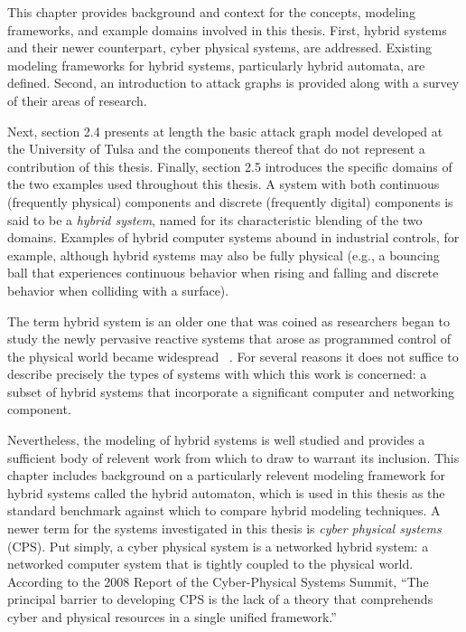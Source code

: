This chapter provides background and context for the concepts, modeling
frameworks, and example domains involved in this thesis. First, hybrid systems
and their newer counterpart, cyber physical systems, are addressed. Existing
modeling frameworks for hybrid systems, particularly hybrid automata, are
defined. Second, an introduction to attack graphs is provided along with a
survey of their areas of research.

Next, section 2.4 presents at length the basic attack graph model developed at the
University of Tulsa and the components thereof that do not represent a
contribution of this thesis. Finally, section 2.5 introduces the specific
domains of the two examples used throughout this thesis.
A system with both continuous (frequently physical) components and discrete (frequently digital)
components is said to be a \emph{hybrid system}, named for its characteristic blending of the
two domains. Examples of hybrid computer systems abound in industrial controls, for example,
although hybrid systems may also be fully physical (e.g., a bouncing ball that experiences continuous
behavior when rising and falling and discrete behavior when colliding with a surface).

The term hybrid system is an older one that was coined as researchers began to study the newly
pervasive reactive systems that arose as programmed control of the physical world became 
widespread ~\cite{alur1993hybrid}. For several reasons it does not suffice to describe precisely
the types of systems with which this work is concerned: a subset of hybrid
systems that incorporate a significant computer and networking component.

Nevertheless, the modeling of hybrid systems is well studied and provides a sufficient body
of relevent work from which to draw to warrant its inclusion. This chapter includes
background on a particularly relevent modeling framework for hybrid systems called the
hybrid automaton, which is used in this thesis as the standard benchmark against which to
compare hybrid modeling techniques.
A newer term for the systems investigated in this thesis is \emph{cyber physical systems}
 (CPS).
Put simply, a cyber physical system is a networked hybrid system: a networked computer system that is 
tightly coupled to the physical world.
According to the 2008 Report of the Cyber-Physical Systems Summit, ``The principal barrier to 
developing CPS is the lack of a theory that comprehends cyber and physical resources in a 
single unified framework.''~\cite{summitreport2008}

